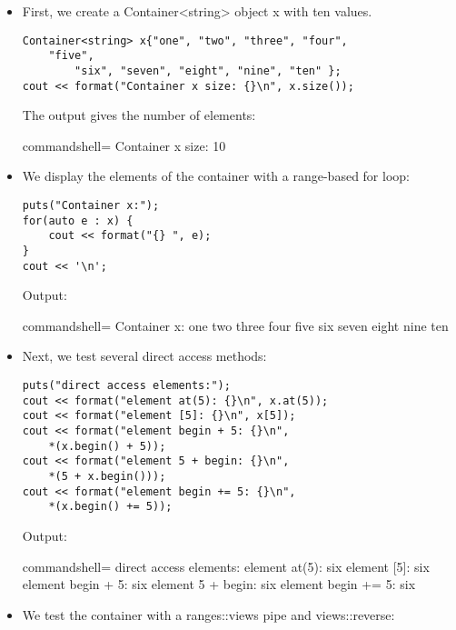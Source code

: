 \begin{itemize}
\item 
First, we create a Container<string> object x with ten values.

\begin{lstlisting}[style=styleCXX]
Container<string> x{"one", "two", "three", "four",
	"five",
		"six", "seven", "eight", "nine", "ten" };
cout << format("Container x size: {}\n", x.size());
\end{lstlisting}

The output gives the number of elements:

\begin{tcblisting}{commandshell={}}
Container x size: 10
\end{tcblisting}

\item 
We display the elements of the container with a range-based for loop:

\begin{lstlisting}[style=styleCXX]
puts("Container x:");
for(auto e : x) {
	cout << format("{} ", e);
}
cout << '\n';
\end{lstlisting}

Output:

\begin{tcblisting}{commandshell={}}
Container x:
one two three four five six seven eight nine ten
\end{tcblisting}

\item 
Next, we test several direct access methods:

\begin{lstlisting}[style=styleCXX]
puts("direct access elements:");
cout << format("element at(5): {}\n", x.at(5));
cout << format("element [5]: {}\n", x[5]);
cout << format("element begin + 5: {}\n",
	*(x.begin() + 5));
cout << format("element 5 + begin: {}\n",
	*(5 + x.begin()));
cout << format("element begin += 5: {}\n",
	*(x.begin() += 5));
\end{lstlisting}

Output:

\begin{tcblisting}{commandshell={}}
direct access elements:
element at(5): six
element [5]: six
element begin + 5: six
element 5 + begin: six
element begin += 5: six
\end{tcblisting}

\item 
We test the container with a ranges::views pipe and views::reverse:


\end{itemize}
